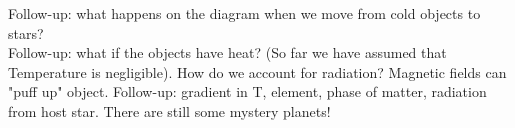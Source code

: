 \documentclass[\main/main.tex]{subfiles}
\begin{document}
Follow-up: what happens on the diagram when we move from cold objects to stars?\\
Follow-up: what if the objects have heat? (So far we have assumed that Temperature is negligible). How do we account for radiation? Magnetic fields can "puff up" object.
Follow-up: gradient in T, element, phase of matter, radiation from host star. There are still some mystery planets!








\end{document}
